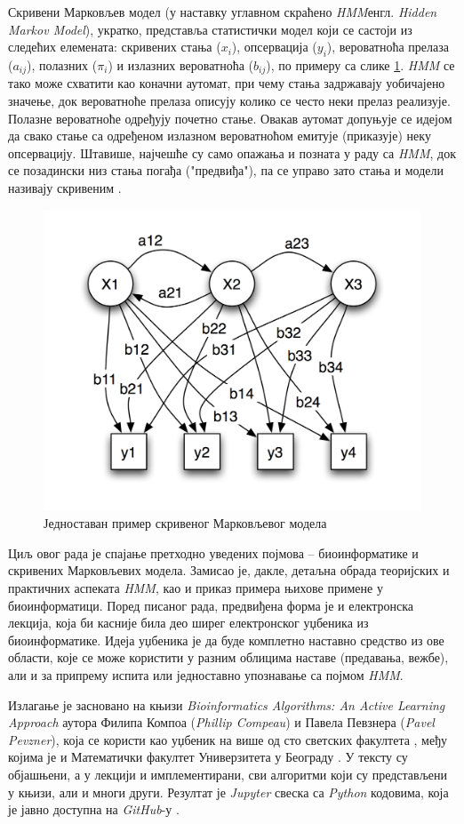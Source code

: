 \documentclass[12pt,oneside]{memoir}
\begin{document}
\begin{CJK}{UTF8}{ipxm}
Скривени Марковљев модел (у наставку углавном скраћено \textit{HMM}енгл. \textit{Hidden Markov Model}), укратко, представља статистички модел који се састоји из следећих елемената: скривених стања ($x_i$), опсервација ($y_i$), вероватноћа прелаза ($a_{ij}$), полазних ($\pi_i$) и излазних вероватноћа ($b_{ij}$), по примеру са слике \ref{fig:hmm}. \textit{HMM} се тако може схватити као коначни аутомат, при чему стања задржавају уобичајено значење, док вероватноће прелаза описују колико се често неки прелаз реализује. Полазне вероватноће одређују почетно стање. Овакав аутомат допуњује се идејом да свако стање са одређеном излазном вероватноћом емитује (приказује) неку опсервацију. Штавише, најчешће су само опажања и позната у раду са \textit{HMM}, док се позадински низ стања погађа ("предвиђа"), па се управо зато стања и модели називају скривеним \cite{stamp2021}.

\begin{figure}[H]
  \centering
  \includegraphics[width=.74\textwidth]{hmm.png}
  \caption{Једноставан пример скривеног Марковљевог модела \cite{hmm}}
  \label{fig:hmm}
\end{figure}

Циљ овог рада је спајање претходно уведених појмова -- биоинформатике и скривених Марковљевих модела. Замисао је, дакле, детаљна обрада теоријских и практичних аспеката \textit{HMM}, као и приказ примера њихове примене у биоинформатици. Поред писаног рада, предвиђена форма је и електронска лекција, која би касније била део ширег електронског уџбеника из биоинформатике. Идеја уџбеника је да буде комплетно наставно средство из ове области, које се може користити у разним облицима наставе (предавања, вежбе), али и за припрему испита или једноставно упознавање са појмом \textit{HMM}. 

Излагање је засновано на књизи \textit{Bioinformatics Algorithms: An Active Learning Approach} \cite{compeau2015} аутора Филипа Компоа (\textit{Phillip Compeau}) и Павела Певзнера (\textit{Pavel Pevzner}), која се користи као уџбеник на више од сто светских факултета \cite{ba}, међу којима је и Математички факултет Универзитета у Београду \cite{matf}. У тексту су објашњени, а у лекцији и имплементирани, сви алгоритми који су представљени у књизи, али и многи други. Резултат је \textit{Jupyter} свеска са \textit{Python} кодовима, која је јавно доступна на \textit{GitHub}-у \cite{vasovich2021}.


\end{CJK}
\end{document}
